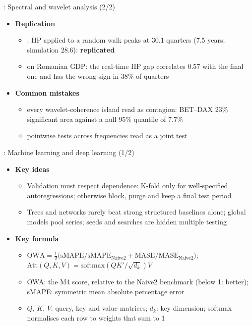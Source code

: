 \begin{frame}{: Spectral and wavelet analysis (2/2)}
\itemsize{\small}
\begin{itemize}
    \item \textbf{Replication}
    \begin{itemize}
        \item {}: HP applied to a random walk peaks at 30.1 quarters (7.5 years; simulation 28.6): \textbf{replicated}
        \item {} on Romanian GDP: the real-time HP gap correlates 0.57 with the final one and has the wrong sign in 38\% of quarters
    \end{itemize}
    \item \textbf{Common mistakes}
    \begin{itemize}
        \item every wavelet-coherence island read as contagion: BET--DAX 23\% significant area against a null 95\% quantile of 7.7\%
        \item pointwise tests across frequencies read as a joint test
    \end{itemize}
\end{itemize}
\end{frame}

\begin{frame}{: Machine learning and deep learning (1/2)}
\itemsize{\footnotesize}
\begin{itemize}
    \item \textbf{Key ideas}
    \begin{itemize}
        \item Validation must respect dependence: K-fold only for well-specified autoregressions; otherwise block, purge and keep a final test period
        \item Trees and networks rarely beat strong structured baselines alone; global models pool series; seeds and searches are hidden multiple testing
    \end{itemize}
    \item \textbf{Key formula}
    \begin{itemize}
        \item $\mathrm{OWA} = \frac12\big(\mathrm{sMAPE}/\mathrm{sMAPE}_{\mathrm{Naive2}} + \mathrm{MASE}/\mathrm{MASE}_{\mathrm{Naive2}}\big)$; $\mathrm{Att}(Q, K, V) = \mathrm{softmax}(QK'/\sqrt{d_k})V$
        \item OWA: the M4 score, relative to the Naive2 benchmark (below 1: better); sMAPE: symmetric mean absolute percentage error
        \item $Q$, $K$, $V$: query, key and value matrices; $d_k$: key dimension; softmax normalises each row to weights that sum to 1
    \end{itemize}
\end{itemize}
\end{frame}


